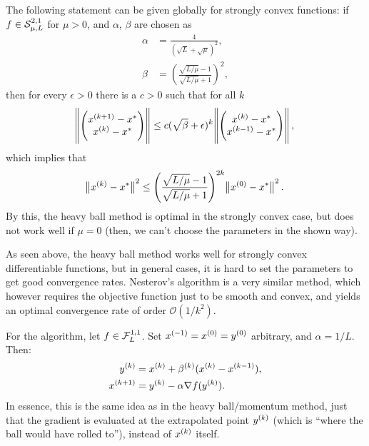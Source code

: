 \documentclass{article}
\begin{document}
The following statement can be given globally for strongly convex functions: if
\(f \in \Strong{\mu}{L}{2}{1}\) for \(\mu > 0\), and \(\alpha\), \(\beta\) are chosen as
\begin{align*}
  \alpha &= \frac{4}{(\sqrt{L} + \sqrt{\mu})^2}, \\
  \beta &= \left( \frac{\sqrt{L/\mu} - 1}{\sqrt{L/\mu} + 1} \right)^2,
\end{align*}
then for every \(\epsilon > 0\) there is a \(c > 0\) such that for all \(k\)
\begin{equation*}
  \enVert{\begin{pmatrix}
      \kth[k+1]{x} - x^* \\
      \kth{x} - x^*
    \end{pmatrix}}
  \leq c(\sqrt{\beta} + \epsilon)^k
  \enVert{\begin{pmatrix}
      \kth[k]{x} - x^* \\
      \kth[k-1]{x} - x^*
    \end{pmatrix}},
\end{equation*}
which implies that
\begin{equation*}
  \enVert[1]{\kth{x} - x^*}^2 \leq
  \left( \frac{\sqrt{L/\mu} - 1}{\sqrt{L/\mu} + 1} \right)^{2k} \enVert[1]{\kth[0]{x} - x^*}^2.
\end{equation*}
By this, the heavy ball method is optimal in the strongly convex case, but does not work well if
\(\mu = 0\) (then, we can't choose the parameters in the shown way).

\label{s:nesterovs-method}

As seen above, the heavy ball method works well for strongly convex differentiable functions, but in
general cases, it is hard to set the parameters to get good convergence rates.  Nesterov's algorithm
is a very similar method, which however requires the objective function just to be smooth and
convex, and yields an optimal convergence rate of order \(\mathcal{O}(1/k^2)\).

For the algorithm, let \(f \in \Lip{L}{1}{1}\).  Set
\(\kth[-1]{x} = \kth[0]{x} = \kth[0]{y}\) arbitrary, and \(\alpha = 1/L\). Then:
\begin{align*}
  \kth{y} &= \kth{x} + \kth{\beta}(\kth{x} - \kth[k-1]{x}), \\
  \kth[k+1]{x} &= \kth{y} - \alpha\nabla f(\kth{y}).
\end{align*}
In essence, this is the same idea as in the heavy ball/momentum method, just that the gradient
is evaluated at the extrapolated point \(\kth{y}\) (which is ``where the ball would have rolled
to''), instead of \(\kth{x}\) itself.
\end{document}
